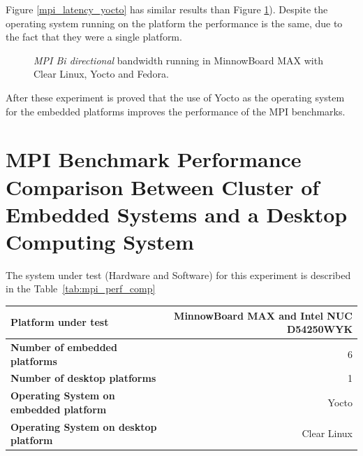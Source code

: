 Figure \ref{mpi_latency_yocto} has similar results than Figure
\ref{mpi_roundtrip_yocto}). Despite the operating system running on the platform
the performance is the same, due to the fact that they were a single platform.


\begin{figure}[H]
\begin{center}
\end{center}
\caption{\textit{MPI Bi directional} bandwidth running in  MinnowBoard MAX  with Clear Linux,
Yocto and Fedora.}
\label{mpi_roundtrip_yocto}
\end{figure}

After these experiment is proved that the use of Yocto as the operating system
for the embedded platforms improves the performance of the MPI benchmarks. 

\section{MPI Benchmark Performance Comparison Between Cluster of Embedded
Systems and a Desktop Computing System}

The system under test (Hardware and Software) for this experiment is described
in the Table~\ref{tab:mpi_perf_comp}
    
    \begin{center}
    \begin{tabular}{ | l | r |}
        \hline
        \textbf{Platform under test} &  MinnowBoard MAX  and Intel NUC D54250WYK\\ \hline
        \textbf{Number of embedded platforms}  & 6  \\ \hline
        \textbf{Number of desktop platforms}  & 1  \\ \hline
        \textbf{Operating System on embedded platform} & Yocto  \\ \hline
        \textbf{Operating System on desktop platform} & Clear Linux  \\ \hline
    \end{tabular}
    \label{tab:mpi_perf_comp}
    \end{center}

